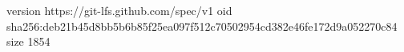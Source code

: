 version https://git-lfs.github.com/spec/v1
oid sha256:deb21b45d8bb5b6b85f25ea097f512c70502954cd382e46fe172d9a052270c84
size 1854

